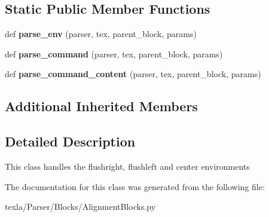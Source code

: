 \subsection*{Static Public Member Functions}
\begin{DoxyCompactItemize}
\item 
\hypertarget{classtexla_1_1Parser_1_1Blocks_1_1AlignmentBlocks_1_1AlignmentBlock_a5498e23e4f9025796f66e743c74aba7e}{}\label{classtexla_1_1Parser_1_1Blocks_1_1AlignmentBlocks_1_1AlignmentBlock_a5498e23e4f9025796f66e743c74aba7e} 
def {\bfseries parse\+\_\+env} (parser, tex, parent\+\_\+block, params)
\item 
\hypertarget{classtexla_1_1Parser_1_1Blocks_1_1AlignmentBlocks_1_1AlignmentBlock_ab3ef5a2ec98c91849e439c477741f2ec}{}\label{classtexla_1_1Parser_1_1Blocks_1_1AlignmentBlocks_1_1AlignmentBlock_ab3ef5a2ec98c91849e439c477741f2ec} 
def {\bfseries parse\+\_\+command} (parser, tex, parent\+\_\+block, params)
\item 
\hypertarget{classtexla_1_1Parser_1_1Blocks_1_1AlignmentBlocks_1_1AlignmentBlock_ae542ab763e7cb2cb277e55974cd9db5c}{}\label{classtexla_1_1Parser_1_1Blocks_1_1AlignmentBlocks_1_1AlignmentBlock_ae542ab763e7cb2cb277e55974cd9db5c} 
def {\bfseries parse\+\_\+command\+\_\+content} (parser, tex, parent\+\_\+block, params)
\end{DoxyCompactItemize}
\subsection*{Additional Inherited Members}


\subsection{Detailed Description}
\begin{DoxyVerb}This class handles the flushright, flushleft
and center environments\end{DoxyVerb}
 

The documentation for this class was generated from the following file\+:\begin{DoxyCompactItemize}
\item 
texla/\+Parser/\+Blocks/Alignment\+Blocks.\+py\end{DoxyCompactItemize}

